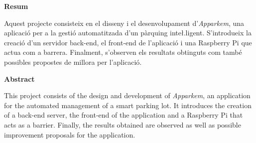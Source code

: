 {}
\centerline{\textbf{Resum}}
Aquest projecte consisteix en el disseny i el desenvolupament d'\emph{Apparkem},
una aplicació per a la gestió automatitzada d'un pàrquing inte\l.ligent.
S'introdueix la creació d'un servidor back-end, el front-end de l'aplicació
i una Raspberry Pi que actua com a barrera. Finalment, s'observen els resultats
obtinguts com també possibles propostes de millora per l'aplicació.
\vfill
{}
{}
\centerline{\textbf{Abstract}}
This project consists of the design and development of \emph{Apparkem}, an application
for the automated management of a smart parking lot. It introduces the creation
of a back-end server, the front-end of the application and a Raspberry Pi that
acts as a barrier. Finally, the results obtained are observed as well as possible
improvement proposals for the application.